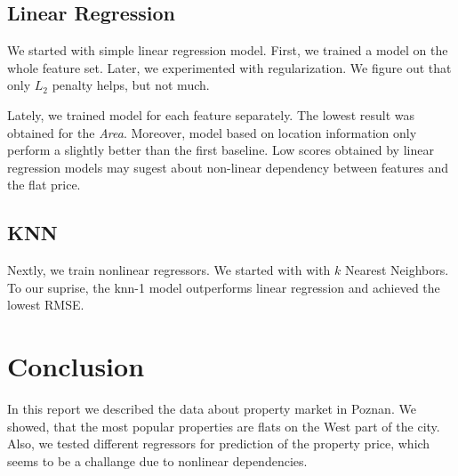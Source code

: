 \documentclass[11pt,a4paper]{article}
\begin{document}
\subsection{Linear Regression}%
\label{sub:linear_regression}
We started with simple linear regression model. First, we trained a model on the whole feature set. Later, we experimented with regularization. We figure out that only $L_2$ penalty helps, but not much.

Lately, we trained model for each feature separately. The lowest result was obtained for the \emph{Area}. Moreover, model based on location information only perform a slightly better than the first baseline.
Low scores obtained by linear regression models may sugest about non-linear dependency between features and the flat price.
\subsection{KNN}%
\label{sub:knn}
Nextly, we train nonlinear regressors. We started with with $k$ Nearest Neighbors. To our suprise, the knn-1 model outperforms linear regression and achieved the lowest RMSE.


\section*{Conclusion}
In this report we described the data about property market in Poznan. We showed, that the most popular properties are flats on the West part of the city. Also, we tested different regressors for prediction of the property price, which seems to be a challange due to nonlinear dependencies.

%
%
%
%
\end{document}
